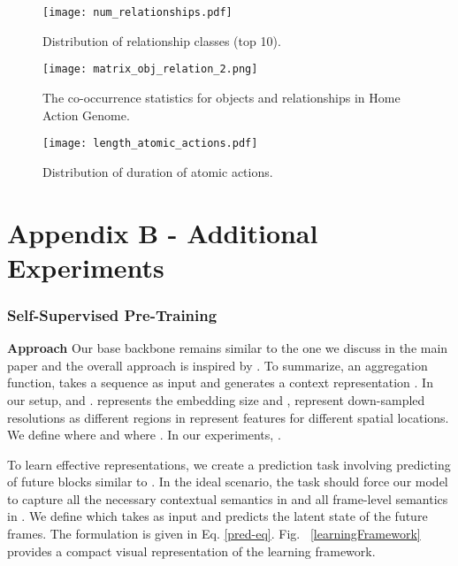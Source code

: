\documentclass[final]{cvpr}
\begin{document}
\begin{figure}[t]
    \begin{center}
    \texttt{[image: num\_relationships.pdf]}
    \caption{Distribution of relationship classes (top 10). \label{fig:rel_dist}}
    \end{center}
\end{figure}

\begin{figure*}[t]
    \begin{center}
    \texttt{[image: matrix\_obj\_relation\_2.png]}
    \caption{The co-occurrence statistics for objects and relationships in Home Action Genome. \label{fig:matrix_obj_rel}}
    \end{center}
\end{figure*}

\begin{figure}[t]
    \begin{center}
    \texttt{[image: length\_atomic\_actions.pdf]}
    \caption{Distribution of duration of atomic actions. \label{fig:dur_dist}}
    \end{center} 
\end{figure}

\renewcommand\thefigure{B.\arabic{figure}}    
\setcounter{figure}{0}   
\renewcommand\thetable{B.\arabic{table}}    
\setcounter{table}{0}   
\section*{Appendix B - Additional Experiments}
\label{sec:experiments}



\subsubsection*{Self-Supervised Pre-Training}

\textbf{Approach} Our base backbone remains similar to the one we discuss in the main paper and the overall approach is inspired by \cite{dpc}. To summarize, an aggregation function,  takes a sequence  as input and generates a context representation . In our setup,  and .  represents the embedding size and ,  represent down-sampled resolutions as different regions in  represent features for different spatial locations. We define  where  and  where . In our experiments, .

To learn effective representations, we create a prediction task involving predicting  of future blocks similar to \cite{dpc}. In the ideal scenario, the task should force our model to capture all the necessary contextual semantics in  and all frame-level semantics in . We define  which takes as input  and predicts the latent state of the future frames. The formulation is given in Eq. \eqref{pred-eq}. Fig. ~\ref{learningFramework} provides a compact visual representation of the learning framework.
\end{document}
